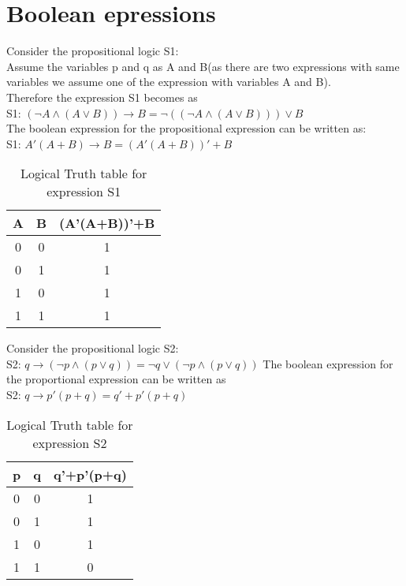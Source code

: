 \documentclass[journal,12pt,twocolumn]{IEEEtran}
\begin{document}
\section{Boolean epressions}
 Consider the propositional logic S1:\\
  Assume the variables p and q as A and B(as there are two expressions with same variables we assume one of the expression with variables A and B).\\
Therefore the expression S1 becomes as\\
S1: $(\neg{A} \land({A}\lor{B})) \longrightarrow B = \neg((\neg{A} \land({A}\lor{B})))\lor{B}$\\
The boolean expression for the propositional expression can be written as:\\
S1: $A'(A+B) \longrightarrow B = (A'(A+B))'+B$
\begin{table}[h]                                   \centering                                        \caption{Logical Truth table for expression S1} 
 \begin{tabular}{|c|c|c|}
 \hline
 A & B & (A'(A+B))'+B\\
 \hline
 0 & 0 & 1\\
 \hline
 0 & 1 & 1\\
 \hline
 1 & 0 & 1\\
 \hline
 1 & 1 & 1\\
 \hline
  \end{tabular}
\end{table}
Consider the propositional logic S2:\\
  S2: $q \longrightarrow (\neg{p}\land({p}\lor{q})) = \neg{q} \lor (\neg{p} \land ({p}\lor {q}))$
 The boolean expression for the proportional expression can be written as\\
 S2: $q \longrightarrow p'(p+q) = q'+p'(p+q)$
\begin{table}[h]                                   \centering                                        \caption{Logical Truth table for expression S2}          \begin{tabular}{|c|c|c|}                          \hline                                            p & q & q'+p'(p+q)\\                              \hline                                            0 & 0 & 1\\
        \hline
        0 & 1 & 1\\
        \hline                                            1 & 0 & 1\\
        \hline
        1 & 1 & 0\\
        \hline
  \end{tabular}
\end{table}
\end{document}
